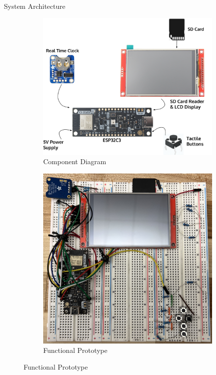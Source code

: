 \documentclass[final]{beamer}
\newlength{\colwidth}
\begin{document}
\begin{frame}[t]
\begin{columns}[t]
\begin{column}{\colwidth}
      \begin{block}{System Architecture}

        \begin{figure}
          \begin{subfigure}[t]{0.54\textwidth}
              \includegraphics[width =\textwidth]{PrototypeDesign.png}
              \caption{Component Diagram}
          \end{subfigure}
          \begin{subfigure}[t]{0.44\textwidth}
              \includegraphics[width=\textwidth]{prototype.jpg}
              \caption{Functional Prototype}
          \end{subfigure}
        \end{figure}


\end{block}
\end{column}
\end{columns}
\end{frame}
\end{document}
